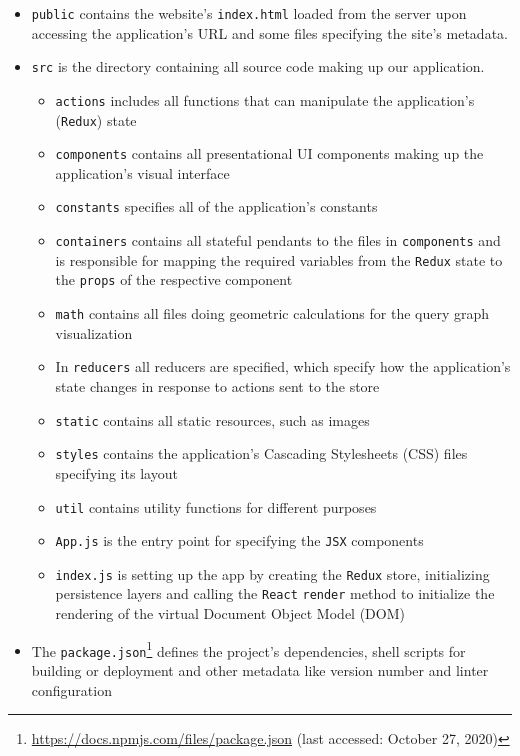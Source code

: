 \begin{itemize}
    \item \texttt{public} contains the website's \texttt{index.html} loaded from the server upon accessing the application's URL and some files specifying the site's metadata.
    \item \texttt{src} is the directory containing all source code making up our application.
    \begin{itemize}
        \item \texttt{actions} includes all functions that can manipulate the application's (\texttt{Redux}) state
        \item \texttt{components} contains all presentational UI components making up the application's visual interface
        \item \texttt{constants} specifies all of the application's constants
        \item \texttt{containers} contains all stateful pendants to the files in \texttt{components} and is responsible for mapping the required variables from the \texttt{Redux} state to the \texttt{props} of the respective component
        \item \texttt{math} contains all files doing geometric calculations for the query graph visualization
        \item In \texttt{reducers} all reducers are specified, which specify how the application's state changes in response to actions sent to the store
        \item \texttt{static} contains all static resources, such as images
        \item \texttt{styles} contains the application's Cascading Stylesheets (CSS) files specifying its layout
        \item \texttt{util} contains utility functions for different purposes
        \item \texttt{App.js} is the entry point for specifying the \texttt{JSX} components
        \item \texttt{index.js} is setting up the app by creating the \texttt{Redux} store, initializing persistence layers and calling the \texttt{React} \texttt{render} method to initialize the rendering of the virtual Document Object Model (DOM)
    \end{itemize}
    \item The \texttt{package.json}\footnote{\url{https://docs.npmjs.com/files/package.json} (last accessed: October 27, 2020)} defines the project's dependencies, shell scripts for building or deployment and other metadata like version number and linter configuration
\end{itemize}

